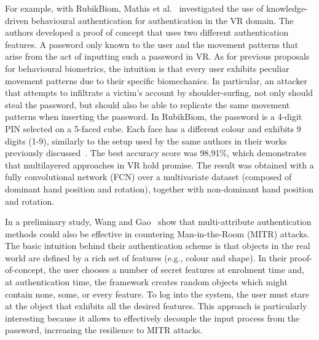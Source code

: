 \documentclass[journal]{IEEEtran}
\begin{document}
For example, with RubikBiom, Mathis et al.~\cite{mathis2020biometrics} investigated the use of knowledge-driven behavioural authentication for authentication in the VR domain. The authors developed a proof of concept that uses two different authentication features. A password only known to the user and the movement patterns that arise from the act of inputting such a password in VR. As for previous proposals for behavioural biometrics, the intuition is that every user exhibits peculiar movement patterns due to their specific biomechanics. In particular, an attacker that attempts to infiltrate a victim's account by shoulder-surfing, not only should steal the password, but should also be able to replicate the same movement patterns when inserting the password. In RubikBiom, the password is a 4-digit PIN selected on a 5-faced cube. Each face has a different colour and exhibits 9 digits (1-9), similarly to the setup used by the same authors in their works previously discussed~\cite{mathis2020,mathis2021}. The best accuracy score was 98,91\%, which demonstrates that multilayered approaches in VR hold promise. The result was obtained with a fully convolutional network (FCN) over a multivariate dataset (composed of dominant hand position and rotation), together with non-dominant hand position and rotation.

In a preliminary study, Wang and Gao~\cite{wang2021} show that multi-attribute authentication methods could also be effective in countering Man-in-the-Room (MITR) attacks. The basic intuition behind their authentication scheme is that objects in the real world are defined by a rich set of features (e.g., colour and shape). In their proof-of-concept, the user chooses a number of secret features at enrolment time and, at authentication time, the framework creates random objects which might contain none, some, or every feature. To log into the system, the user must stare at the object that exhibits all the desired features. This approach is particularly interesting because it allows to effectively decouple the input process from the password, increasing the resilience to MITR attacks.
\end{document}
